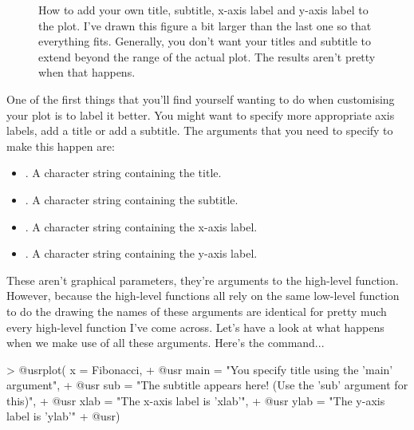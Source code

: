 
\begin{figure}[t]
\begin{center}
\caption{How to add your own title, subtitle, x-axis label and y-axis label to the plot. I've drawn this figure a bit larger than the last one so that everything fits. Generally, you don't want your titles and subtitle to extend beyond the range of the actual plot. The results aren't pretty when that happens.}
\HR
\label{fig:secondplot}
\end{center}
\end{figure}

One of the first things that you'll find yourself wanting to do when customising your plot is to label it better. You might want to specify more appropriate axis labels, add a title or add a subtitle. The arguments that you need to specify to make this happen are:
\begin{itemize} \itemsep 0pt
\item {}. A character string containing the title.
\item {}. A character string containing the subtitle.
\item {}. A character string containing the x-axis label.
\item {}. A character string containing the y-axis label.
\end{itemize}
These aren't graphical parameters, they're arguments to the high-level function. However, because the high-level functions all rely on the same low-level function to do the drawing the names of these arguments are identical for pretty much every high-level function I've come across. Let's have a look at what happens when we make use of all these arguments. Here's the command...
\begin{rblock1}
> @usr{plot( x = Fibonacci,} 
+ @usr{      main = "You specify title using the 'main' argument",}
+ @usr{      sub = "The subtitle appears here! (Use the 'sub' argument for this)",}
+ @usr{      xlab = "The x-axis label is 'xlab'",}
+ @usr{      ylab = "The y-axis label is 'ylab'"}
+ @usr{)}
\end{rblock1}
